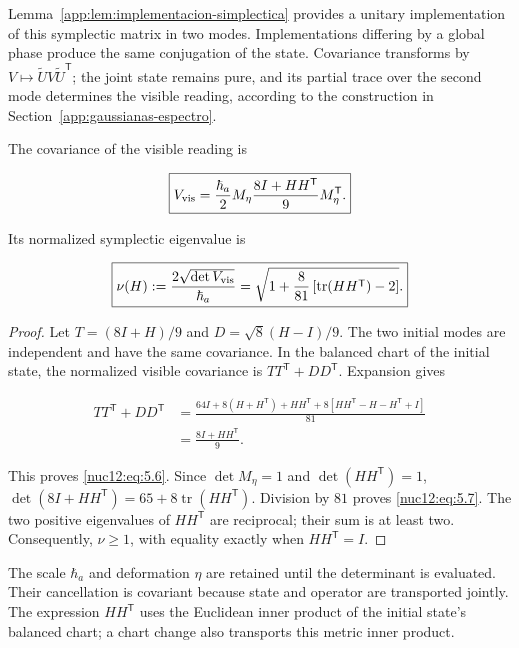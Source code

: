 Lemma~\ref{app:lem:implementacion-simplectica} provides a unitary implementation of this symplectic matrix in two modes. Implementations differing by a global phase produce the same conjugation of the state. Covariance transforms by \(V\mapsto\widetilde U V\widetilde U^{\mathsf T}\); the joint state remains pure, and its partial trace over the second mode determines the visible reading, according to the construction in Section~\ref{app:gaussianas-espectro}.

\begin{theorem}

The covariance of the visible reading is

\begin{equation}
\boxed{V_{\rm vis}=
\frac{\hbar_a}{2}M_\eta
\frac{8I+HH^{\mathsf T}}9
M_\eta^{\mathsf T}.}
\label{nuc12:eq:5.6}
\end{equation}

Its normalized symplectic eigenvalue is

\begin{equation}
\boxed{\nu(H):=\frac{2\sqrt{\det V_{\rm vis}}}{\hbar_a}
=\sqrt{1+\frac8{81}\left[\operatorname{tr}(HH^{\mathsf T})-2\right]}.}
\label{nuc12:eq:5.7}
\end{equation}
\end{theorem}

\begin{proof}
Let \(T=(8I+H)/9\) and \(D=\sqrt8(H-I)/9\). The two initial modes are independent and have the same covariance. In the balanced chart of the initial state, the normalized visible covariance is \(TT^{\mathsf T}+DD^{\mathsf T}\). Expansion gives

\[
\begin{aligned}
TT^{\mathsf T}+DD^{\mathsf T}
&=\frac{64I+8(H+H^{\mathsf T})+HH^{\mathsf T}
+8[HH^{\mathsf T}-H-H^{\mathsf T}+I]}{81}\\
&=\frac{8I+HH^{\mathsf T}}9.
\end{aligned}
\]

This proves \eqref{nuc12:eq:5.6}. Since \(\det M_\eta=1\) and \(\det(HH^{\mathsf T})=1\), \(\det(8I+HH^{\mathsf T})=65+8\operatorname{tr}(HH^{\mathsf T})\). Division by \(81\) proves \eqref{nuc12:eq:5.7}. The two positive eigenvalues of \(HH^{\mathsf T}\) are reciprocal; their sum is at least two. Consequently, \(\nu\geq1\), with equality exactly when \(HH^{\mathsf T}=I\).
\end{proof}

The scale \(\hbar_a\) and deformation \(\eta\) are retained until the determinant is evaluated. Their cancellation is covariant because state and operator are transported jointly. The expression \(HH^{\mathsf T}\) uses the Euclidean inner product of the initial state's balanced chart; a chart change also transports this metric inner product.

